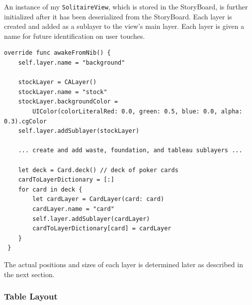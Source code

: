 \documentclass[11pt]{article}
\begin{document}
An instance of my {\tt SolitaireView}, which is stored in the StoryBoard, is
further initialized after it has been deserialized from the StoryBoard.
Each layer is created and added as a sublayer to the view's main layer.
Each layer is given a name for future identification on user touches.
\begin{verbatim}
override func awakeFromNib() {
    self.layer.name = "background"
      
    stockLayer = CALayer()
    stockLayer.name = "stock"
    stockLayer.backgroundColor = 
        UIColor(colorLiteralRed: 0.0, green: 0.5, blue: 0.0, alpha: 0.3).cgColor
    self.layer.addSublayer(stockLayer)
    
    ... create and add waste, foundation, and tableau sublayers ...
    
    let deck = Card.deck() // deck of poker cards
    cardToLayerDictionary = [:]
    for card in deck {
        let cardLayer = CardLayer(card: card)
        cardLayer.name = "card"
        self.layer.addSublayer(cardLayer)
        cardToLayerDictionary[card] = cardLayer
    }
 }
\end{verbatim}
The actual positions and sizes of each layer is determined later
as described in the next section.

\subsubsection{Table Layout}
\end{document}

